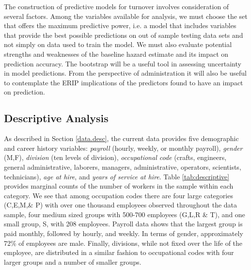 \documentclass[12pt,letterpaper]{article}
\begin{document}
The construction of predictive models for turnover involves consideration of several factors. Among the variables available for analysis, we must choose the set that offers the maximum predictive power, i.e. a model that includes variables that provide the best possible predictions on out of sample testing data sets and not simply on data used to train the model. We must also evaluate potential strengths and weaknesses of the baseline hazard estimate and its impact on prediction accuracy.  The bootstrap will be a useful tool in assessing uncertainty in model predictions. From the perspective of administration it will also be useful to contemplate the ERIP implications of the predictors found to have an impact on prediction.

\subsection{Descriptive Analysis}

As described in Section \ref{data.desc}, the current data provides five demographic and career history variables: {\it payroll} (hourly, weekly, or monthly payroll), {\it gender} (M,F), {\it division} (ten levels of division), {\it occupational code} (crafts, engineers, general administrative, laborers, managers, administrative, operators, scientists, technicians), {\it age at hire}, and {\it years of service at hire}. Table \ref{tab:descriptive} provides marginal counts of the number of workers in the sample within each category.  We see that among occupation codes there are four large categories (C,E,M,\& P)  with over one thousand employees observed throughout the data sample, four medium sized groups with 500-700 employees (G,L,R \& T), and one small group, S, with 208 employees.  Payroll data shows that the largest group is paid monthly, followed by hourly, and weekly.  In terms of gender, approximately 72\% of employees are male. Finally, divisions, while not fixed over the life of the employee, are distributed in a similar fashion to occupational codes with four larger groups and a number of smaller groups.
\end{document}
